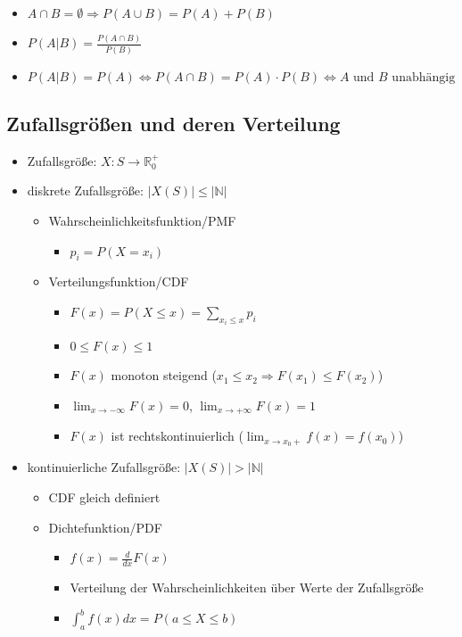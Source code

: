 \documentclass[nonacm=true, language=german]{acmart}
\begin{document}
\begin{itemize}
    \item $ A \cap B = \emptyset \Rightarrow P(A \cup B) = P(A) + P(B) $
    \item $ P(A|B) = \frac{P(A \cap B)}{P(B)} $
    \item $ P(A|B) = P(A) \Leftrightarrow P(A \cap B) = P(A) \cdot P(B) \Leftrightarrow A \text{ und } B \text{ unabhängig} $
\end{itemize}

\subsection{Zufallsgrößen und deren Verteilung}

\begin{itemize}
    \item Zufallsgröße: $ X: S \to \mathbb{R}_0^+ $
    \item diskrete Zufallsgröße: $ |X(S)| \leq |\mathbb{N}| $
    \begin{itemize}
        \item Wahrscheinlichkeitsfunktion/\ac{PMF}
        \begin{itemize}
            \item $ p_i = P(X = x_i) $
        \end{itemize}
        \item Verteilungsfunktion/\ac{CDF}
        \begin{itemize}
            \item $ \displaystyle F(x) = P(X \leq x) = \sum_{x_i \leq x} p_i $
            \item $0 \leq F(x) \leq 1$
            \item $F(x)$ monoton steigend ($x_1 \leq x_2 \Rightarrow F(x_1) \leq F(x_2)$)
            \item $ \displaystyle \lim_{x \to -\infty} F(x) = 0 $, $ \displaystyle \lim_{x \to +\infty} F(x) = 1 $
            \item $F(x)$ ist rechtskontinuierlich ($ \displaystyle \lim_{x \to x_0+} f(x) = f(x_0) $)
        \end{itemize}
    \end{itemize}
    \item kontinuierliche Zufallsgröße: $ |X(S)| > |\mathbb{N}| $
    \begin{itemize}
        \item \ac{CDF} gleich definiert 
        \item Dichtefunktion/\ac{PDF}
        \begin{itemize}
            \item $f(x) = \frac{d}{dx} F(x)$
            \item Verteilung der Wahrscheinlichkeiten über Werte der Zufallsgröße
            \item $ \displaystyle \int_a^b f(x) dx = P(a \leq X \leq b) $
        \end{itemize}
    \end{itemize}
\end{itemize}
\end{document}

